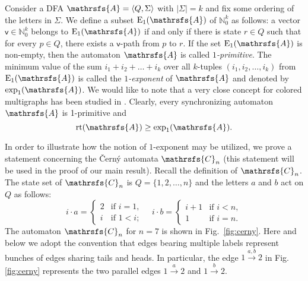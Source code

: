 \documentclass[12pt,twoside]{article}
\DeclareMathOperator{\rt}{rt}
\begin{document}
Consider a DFA $\mathrsfs{A} = \langle Q, \Sigma \rangle$ with $|\Sigma| = k$
and fix some ordering of the letters in $\Sigma$. We define a subset
$\mathrm{E}_1(\mathrsfs{A})$ of $\mathbb{N}^{k}_0$ as follows: a vector
$\mathsf{v} \in \mathbb{N}^{k}_0$ belongs to $\mathrm{E}_1(\mathrsfs{A})$ if
and only if there is state $r \in Q$ such that for every $p \in Q$, there
exists a $\mathsf{v}$-path from $p$ to $r$. If the set
$\mathrm{E}_1(\mathrsfs{A})$ is non-empty, then the automaton $\mathrsfs{A}$ is
called \emph{$1$-primitive}. The minimum value of the sum $i_1 + i_2 + \dots +
i_k$ over all $k$-tuples $(i_1, i_2, \ldots, i_k)$ from
$\mathrm{E}_1(\mathrsfs{A})$ is called the \emph{$1$-exponent} of
$\mathrsfs{A}$ and denoted by $\exp_1(\mathrsfs{A})$. We would like to note
that a very close concept for colored multigraphs has been studied in
\cite{ShSu03,OlShDr02}. Clearly, every synchronizing automaton $\mathrsfs{A}$
is 1-primitive and
\begin{equation}
\label{third inequality} \rt(\mathrsfs{A})\geq \exp_1(\mathrsfs{A}).
\end{equation}

In order to illustrate how the notion of $1$-exponent may be utilized, we prove
a statement concerning the \v{C}ern\'{y} automata $\mathrsfs{C}_n$ (this
statement will be used in the proof of our main result). Recall the definition
of $\mathrsfs{C}_n$. The state set of $\mathrsfs{C}_n$ is $Q=\{1,2,\dots,n\}$
and the letters $a$ and $b$ act on $Q$ as follows:
$$i \cdot a =\begin{cases}
2 &\text{if } i = 1,\\
i &\text{if } 1 < i;
\end{cases}\quad
i \cdot b =\begin{cases}
i+1 &\text{if } i<n,\\
1 &\text{if } i=n.
\end{cases}$$
The automaton $\mathrsfs{C}_n$ for $n = 7$ is shown in Fig.~\ref{fig:cerny}.
Here and below we adopt the convention that edges bearing multiple labels
represent bunches of edges sharing tails and heads. In particular, the edge
$1\xrightarrow{a,b}2$ in Fig.\,\ref{fig:cerny} represents the two parallel
edges $1\xrightarrow{a}2$ and $1\xrightarrow{b}2$.
\end{document}
